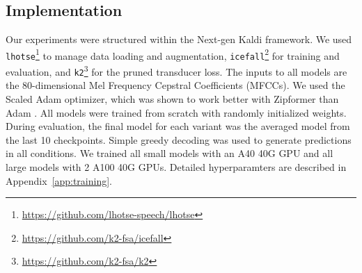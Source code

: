\documentclass[11pt]{article}
\begin{document}
\subsection{Implementation} Our experiments were structured within the Next-gen Kaldi framework. We used \texttt{lhotse}\footnote{\url{https://github.com/lhotse-speech/lhotse}} to manage data loading and augmentation, \texttt{icefall}\footnote{\url{https://github.com/k2-fsa/icefall}} for training and evaluation, and \texttt{k2}\footnote{\url{https://github.com/k2-fsa/k2}} for the pruned transducer loss. The inputs to all models are the 80-dimensional Mel Frequency Cepstral Coefficients (MFCCs).
We used the Scaled Adam optimizer, which was shown to work better with Zipformer than Adam \citep{yao2023zipformer}. All models were trained from scratch with randomly initialized weights. During evaluation, the final model for each variant was the averaged model from the last 10 checkpoints. Simple greedy decoding was used to generate predictions in all conditions. We trained all small models with an A40 40G GPU and all large models with 2 A100 40G GPUs. 
Detailed hyperparamters are described in Appendix~\ref{app:training}.
\end{document}
